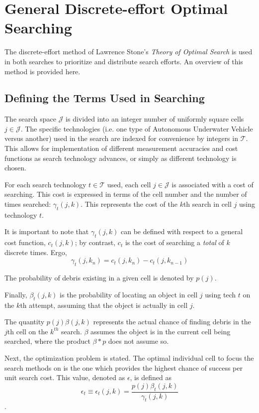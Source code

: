 \documentclass[a4paper]{article}
\begin{document}
\section{General Discrete-effort Optimal Searching}

The discrete-effort method of Lawrence Stone's \textit{Theory of Optimal Search} is used in both searches to prioritize and distribute search efforts. An overview of this method is provided here. 

\subsection{Defining the Terms Used in Searching}

The search space $\mathcal{J}$ is divided into an integer number of uniformly square cells $j\in\mathcal{J}$. The specific technologies (i.e. one type of Autonomous Underwater Vehicle versus another) used in the search are indexed for convenience by integers in $\mathcal{T}$. This allows for implementation of different measurement accuracies and cost functions as search technology advances, or simply as different technology is chosen. 

For each search technology $t\in\mathcal{T}$ used, each cell $j\in\mathcal{J}$ is associated with a cost of searching. This cost is expressed in terms of the cell number and the number of times searched: $\gamma_t(j,k)$. This represents the cost of the $k$th search in cell $j$ using technology $t$.

It is important to note that $\gamma_t(j,k)$ can be defined with respect to a general cost function, $c_t(j,k)$; by contrast, $c_t$ is the cost of searching  a \textit{total} of $k$ discrete times. Ergo, $$\gamma_t(j,k_n)=c_t(j,k_n)-c_t(j,k_{n-1})$$

The probability of debris existing in a given cell is denoted by $p(j)$.

Finally, $\beta_t(j,k)$ is the probability of locating an object in cell $j$ using tech $t$ on the $k$th attempt, assuming that the object is actually in cell $j$.

The quantity $p(j)\beta(j,k)$ represents the actual chance of finding debris in the $j$th cell on the $k^{th}$ search. $\beta$ assumes the object is in the current cell being searched, where the product $\beta * p$ does not assume so.

Next, the optimization problem is stated. The optimal individual cell to focus the search methods on is the one which provides the highest chance of success per unit search cost. This value, denoted as $\epsilon$, is defined as $$\epsilon_t\equiv\epsilon_t(j,k)=\frac{p(j)\beta_t(j,k)}{\gamma_t(j,k)}$$. 
\end{document}
